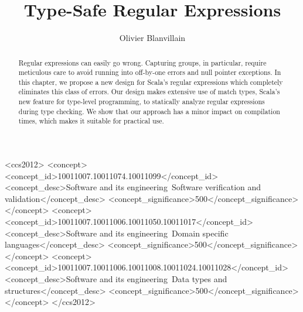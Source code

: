 \documentclass[sigplan,screen]{acmart} %
\begin{document}
\title{Type-Safe Regular Expressions}

\author{Olivier Blanvillain}

\begin{abstract}
Regular expressions can easily go wrong.
Capturing groups, in particular, require meticulous care to avoid running into off-by-one errors and null pointer exceptions.
In this chapter, we propose a new design for Scala's regular expressions which completely eliminates this class of errors.
Our design makes extensive use of match types, Scala's new feature for type-level programming, to statically analyze regular expressions during type checking.
We show that our approach has a minor impact on compilation times, which makes it suitable for practical use.
\end{abstract}

\begin{CCSXML}
<ccs2012>
  <concept>
    <concept_id>10011007.10011074.10011099</concept_id>
    <concept_desc>Software and its engineering~Software verification and validation</concept_desc>
    <concept_significance>500</concept_significance>
  </concept>
  <concept>
    <concept_id>10011007.10011006.10011050.10011017</concept_id>
    <concept_desc>Software and its engineering~Domain specific languages</concept_desc>
    <concept_significance>500</concept_significance>
  </concept>
  <concept>
    <concept_id>10011007.10011006.10011008.10011024.10011028</concept_id>
    <concept_desc>Software and its engineering~Data types and structures</concept_desc>
    <concept_significance>500</concept_significance>
  </concept>
</ccs2012>
\end{CCSXML}

\end{document}
